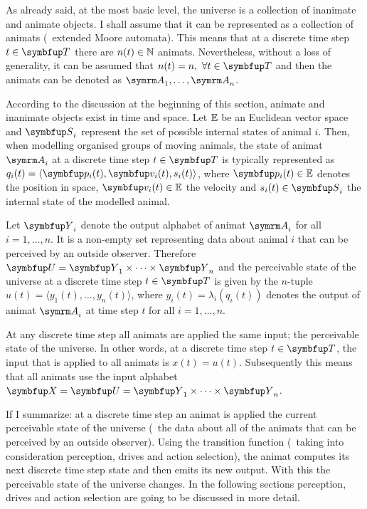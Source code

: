 As already said, at the most basic level, the universe is a collection of inanimate and animate objects. I shall assume that it can be represented as a collection of animats (\ie\ extended Moore automata). This means that at a discrete time step $t \in \set{T}$ there are $n(t) \in \mathbb{N}$ animats. Nevertheless, without a loss of generality, it can be assumed that $n(t)=n,\ \forall t \in \set{T}$ and then the animats can be denoted as $\autom{A}_1,\ldots,\autom{A}_n$. 

According to the discussion at the beginning of this section, animate and inanimate objects exist in time and space. Let $\mathbb{E}$ be an Euclidean vector space and $\set{S}_i$ represent the set of possible internal states of animal $i$. Then, when modelling organised groups of moving animals, the state of animat $\autom{A}_i$ at a discrete time step $t \in \set{T}$ is typically represented as $q_i(t)=\langle \vect{p}_i(t), \vect{v}_i(t), s_i(t) \rangle$, where $\vect{p}_i(t) \in \E$ denotes the position in space, $\vect{v}_i(t) \in \E$ the velocity and $s_i(t) \in \set{S}_i$ the internal state of the modelled animal. 

Let $\set{Y}_i$ denote the output alphabet of animat $\autom{A}_i$ for all $i=1,\ldots,n$. It is a non-empty set representing data about animal $i$ that can be perceived by an outside observer. Therefore $\set{U}=\set{Y}_1 \times \cdots \times \set{Y}_n$ and the perceivable state of the universe at a discrete time step $t \in \set{T}$ is given by the $n$-tuple $u(t)=\langle y_1(t),\ldots,y_n(t)\rangle$, where $y_i(t)=\lambda_i(q_i(t))$ denotes the output of animat $\autom{A}_i$ at time step $t$ for all $i=1,\ldots,n$. 

At any discrete time step all animats are applied the same input; the perceivable state of the universe. In other words, at a discrete time step $t \in \set{T}$, the input that is applied to all animats is $x(t)=u(t)$. Subsequently this means that all animats use the input alphabet $\set{X}=\set{U}=\set{Y}_1 \times \cdots \times \set{Y}_n$.

If I summarize: at a discrete time step an animat is applied the current perceivable state of the universe (\ie\ the data about all of the animats that can be perceived by an outside observer). Using the transition function (\ie\ taking into consideration perception, drives and action selection), the animat computes its next discrete time step state and then emits its new output. With this the perceivable state of the universe changes. In the following sections perception, drives and action selection are going to be discussed in more detail.

